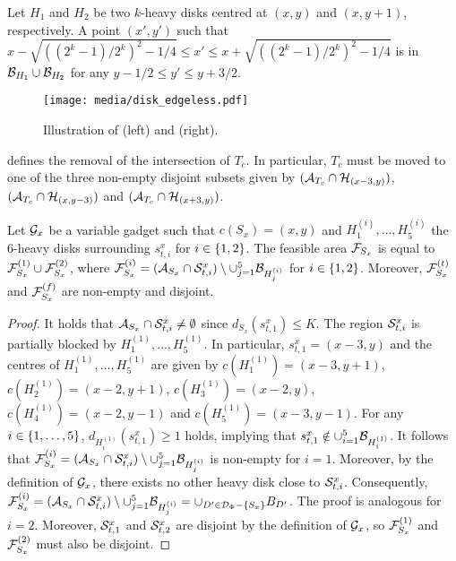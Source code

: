 \begin{toappendix}
\begin{toappendix}
\begin{observation}\label{obs:horizontal_condition}
    Let $H_1$ and $H_2$ be two $k$-heavy disks centred at $(x,y)$ and $(x,y+1)$, respectively. A point $(x',y')$ such that $x - \sqrt{((2^k-1)/2^k)^2 - 1/4} \le x' \le x + \sqrt{((2^k-1)/2^k)^2 - 1/4}$ is in $\B_{H_1} \cup \B_{H_2}$ for any $y-1/2\le y' \le y+3/2 $.
\end{observation}
    
\begin{figure}[tb]
    \centering
    \texttt{[image: media/disk\_edgeless.pdf]}
    \caption{Illustration of  (left) and  (right).}
\end{figure}


 defines the removal of the intersection of $T_c$. In particular, $T_c$ must be moved to one of the three non-empty disjoint subsets given by $(\A_{T_c} \cap \H_{(x-3,y)})$, $(\A_{T_c} \cap \H_{(x,y-3)})$ and $(\A_{T_c} \cap \H_{(x+3,y)})$.

\begin{mlemmarep}\label{lem:sx_two_subsets}
    Let $\G_{x}$ be a variable gadget such that $c(S_x) = (x,y)$ and $H_1^{(i)},\ldots,H_5^{(i)}$ the $6$-heavy disks surrounding $s^x_{t,i}$ for $i \in \set{1,2}$.
    The feasible area $\F_{S_x}$ is equal to $\F_{S_x}^{(1)} \cup \F_{S_x}^{(2)}$, where $\F_{S_x}^{(i)} = (\A_{S_x}\cap \S^x_{t,i})\setminus \cup_{j=1}^5 \B_{H_j^{(i)}}$ for $i \in \set{1,2}$.
    Moreover, $\F_{S_x}^{(t)}$ and $\F_{S_x}^{(f)}$ are non-empty and disjoint.
\end{mlemmarep}
\begin{proof}
    It holds that $\A_{S_x}\cap \S^x_{t,i} \neq \emptyset$ since $d_{S_x}(s^x_{t,1}) \le K$.
    The region $\S^x_{t,i}$ is partially blocked by $H_1^{(1)},\ldots,H_5^{(1)}$.
    In particular, $s^x_{t,1} = (x-3,y)$ and the centres of $H_1^{(1)},\ldots,H_5^{(1)}$ are given by $c(H_1^{(1)}) = (x-3,y+1)$, $c(H_2^{(1)}) = (x-2,y+1)$, $c(H_3^{(1)}) = (x-2,y)$, $c(H_4^{(1)}) = (x-2,y-1)$ and $c(H_5^{(1)}) = (x-3,y-1)$.
    For any $i \in \set{1,\ldots,5}$, $d_{H_i^{(1)}}(s_{t,1}^x) \ge 1$ holds, implying that $s_{t,1}^x \notin \cup_{i=1}^5 \B_{H_i^{(1)}}$.
    It follows that $\F_{S_x}^{(i)} = (\A_{S_x}\cap \S^x_{t,i})\setminus \cup_{j=1}^5 \B_{H_j^{(i)}}$ is non-empty for $i = 1$.
    Moreover, by the definition of $\G_x$, there exists no other heavy disk close to $\S^x_{t,i}$.
    Consequently, $\F_{S_x}^{(i)} = (\A_{S_x}\cap \S^x_{t,i})\setminus \cup_{j=1}^5 \B_{H_j^{(i)}} = \cup_{D'\in\cstate-\{S_x\}}B_{D'}$.
    The proof is analogous for $i = 2$.
    Moreover, $\S^x_{t,1}$ and $\S^x_{t,2}$ are disjoint by the definition of $\G_x$, so $\F_{S_x}^{(1)}$ and $\F_{S_x}^{(2)}$ must also be disjoint.


\end{proof}
\end{toappendix}
\end{toappendix}
